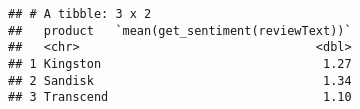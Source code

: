 \documentclass[
]{article}
\newenvironment{Shaded}{\begin{snugshade}}{\end{snugshade}}
\newcommand{\KeywordTok}[1]{\textcolor[rgb]{0.13,0.29,0.53}{\textbf{#1}}}
\newcommand{\NormalTok}[1]{#1}
\newcommand{\OperatorTok}[1]{\textcolor[rgb]{0.81,0.36,0.00}{\textbf{#1}}}
\newcommand{\StringTok}[1]{\textcolor[rgb]{0.31,0.60,0.02}{#1}}
\begin{document}
\begin{Shaded}
\end{Shaded}

\begin{verbatim}
## # A tibble: 3 x 2
##   product   `mean(get_sentiment(reviewText))`
##   <chr>                                 <dbl>
## 1 Kingston                               1.27
## 2 Sandisk                                1.34
## 3 Transcend                              1.10
\end{verbatim}
\end{document}

